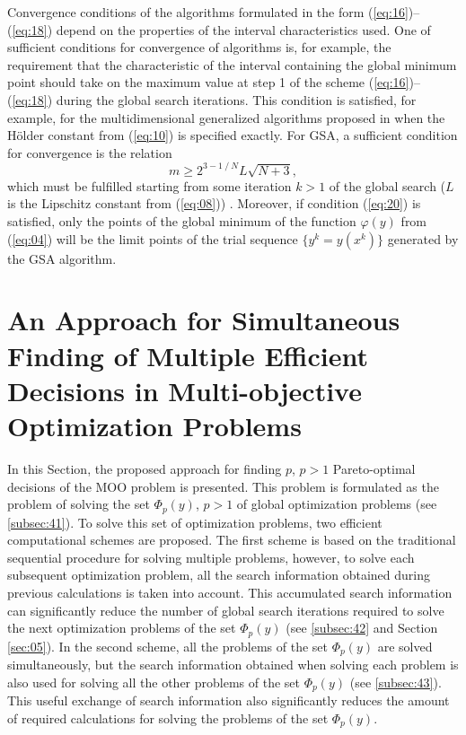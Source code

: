 \documentclass[runningheads]{llncs}
\begin{document}
Convergence conditions of the algorithms formulated in the form (\ref{eq:16})--(\ref{eq:18}) depend on the properties of the interval characteristics used. One of sufficient conditions for convergence of algorithms is, for example, the requirement that the characteristic of the interval containing the global minimum point should take on the maximum value at step 1 of the scheme (\ref{eq:16})--(\ref{eq:18}) during the global search iterations. This condition is satisfied, for example, for the multidimensional generalized algorithms proposed in \cite{c22,c23} when the H{\"o}lder constant from (\ref{eq:10}) is specified exactly. For GSA, a sufficient condition for convergence is the relation 
\begin{equation}
\label{eq:20}
m \geq 2^{3-1⁄N} L\sqrt{N+3},
\end{equation}
which must be fulfilled starting from some iteration $k>1$ of the global search ($L$ is the Lipschitz constant from (\ref{eq:08})) \cite{c15}. Moreover, if condition (\ref{eq:20}) is satisfied, only the points of the global minimum of the function $\varphi(y)$ from (\ref{eq:04}) will be the limit points of the trial sequence $\{y^k=y(x^k)\}$ generated by the GSA algorithm.

\section{An Approach for Simultaneous Finding of Multiple Efficient Decisions in Multi-objective Optimization Problems} \label{sec:04}

In this Section, the proposed approach for finding $p$, $p>1$ Pareto-optimal decisions of the MOO problem is presented. This problem is formulated as the problem of solving the set $\Phi_p (y)$, $p>1$ of global optimization problems (see \ref{subsec:41}). To solve this set of optimization problems, two efficient computational schemes are proposed. The first scheme is based on the traditional sequential procedure for solving multiple problems, however, to solve each subsequent optimization problem, all the search information obtained during previous calculations is taken into account. This accumulated search information can significantly reduce the number of global search iterations required to solve the next optimization problems of the set $\Phi_p (y)$ (see \ref{subsec:42} and Section \ref{sec:05}). In the second scheme, all the problems of the set $\Phi_p (y)$ are solved simultaneously, but the search information obtained when solving each problem is also used for solving all the other problems of the set $\Phi_p (y)$ (see \ref{subsec:43}). This useful exchange of search information also significantly reduces the amount of required calculations for solving the problems of the set $\Phi_p (y)$.
\end{document}
